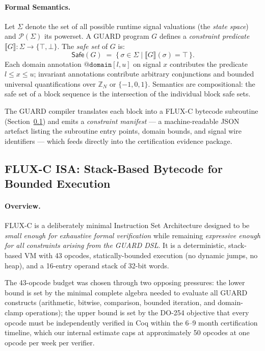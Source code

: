 \documentclass[sigplan,review,anonymous]{acmart}
\begin{document}
\paragraph{Formal Semantics.}
Let $\Sigma$ denote the set of all possible runtime signal valuations (the
\emph{state space}) and $\mathcal{P}(\Sigma)$ its powerset.
A GUARD program $G$ defines a \emph{constraint predicate}
$\llbracket G \rrbracket : \Sigma \to \{\top, \bot\}$.
The \emph{safe set} of $G$ is:
\[
  \mathsf{Safe}(G) \;=\; \{\, \sigma \in \Sigma \mid \llbracket G \rrbracket(\sigma) = \top \,\}.
\]
Each domain annotation $\texttt{@domain}[l, u]$ on signal $x$ contributes
the predicate $l \le x \le u$; invariant annotations contribute arbitrary
conjunctions and bounded universal quantifications over $\mathbb{Z}_N$ or $\{-1,0,1\}$.
Semantics are compositional: the safe set of a block sequence is the
intersection of the individual block safe sets.

The GUARD compiler translates each block into a FLUX-C bytecode subroutine
(Section~\ref{sec:fluxc}) and emits a \emph{constraint manifest} — a
machine-readable JSON artefact listing the subroutine entry points,
domain bounds, and signal wire identifiers — which feeds directly into the
certification evidence package.

\subsection{FLUX-C ISA: Stack-Based Bytecode for Bounded Execution}
\label{sec:fluxc}

\paragraph{Overview.}
FLUX-C is a deliberately minimal Instruction Set Architecture designed to
be \emph{small enough for exhaustive formal verification} while remaining
\emph{expressive enough for all constraints arising from the GUARD DSL}.
It is a deterministic, stack-based VM with 43 opcodes, statically-bounded
execution (no dynamic jumps, no heap), and a 16-entry operand stack of
32-bit words.

The 43-opcode budget was chosen through two opposing pressures: the lower
bound is set by the minimal complete algebra needed to evaluate all GUARD
constructs (arithmetic, bitwise, comparison, bounded iteration, and
domain-clamp operations); the upper bound is set by the DO-254 objective
that every opcode must be independently verified in Coq within the
6–9 month certification timeline, which our internal estimate caps at
approximately 50 opcodes at one opcode per week per verifier.
\end{document}
